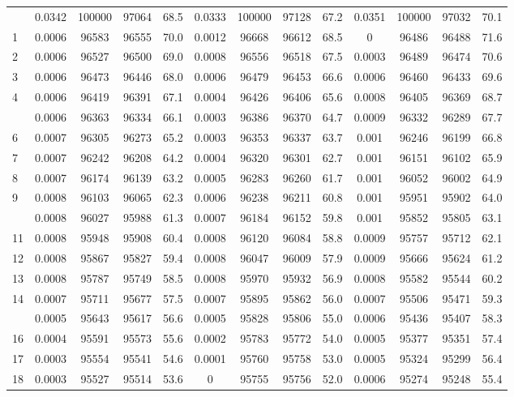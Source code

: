 \documentclass[
  14pt,
]{article}
\begin{document}
\begin{longtable}[t]{lcccccccccccc}
\endfoot
\bottomrule
\endlastfoot
0 & 0.0342 & 100000 & 97064 & 68.5 & 0.0333 & 100000 & 97128 & 67.2 & 0.0351 & 100000 & 97032 & 70.1\\
1 & 0.0006 & 96583 & 96555 & 70.0 & 0.0012 & 96668 & 96612 & 68.5 & 0 & 96486 & 96488 & 71.6\\
2 & 0.0006 & 96527 & 96500 & 69.0 & 0.0008 & 96556 & 96518 & 67.5 & 0.0003 & 96489 & 96474 & 70.6\\
3 & 0.0006 & 96473 & 96446 & 68.0 & 0.0006 & 96479 & 96453 & 66.6 & 0.0006 & 96460 & 96433 & 69.6\\
4 & 0.0006 & 96419 & 96391 & 67.1 & 0.0004 & 96426 & 96406 & 65.6 & 0.0008 & 96405 & 96369 & 68.7\\
\addlinespace
5 & 0.0006 & 96363 & 96334 & 66.1 & 0.0003 & 96386 & 96370 & 64.7 & 0.0009 & 96332 & 96289 & 67.7\\
6 & 0.0007 & 96305 & 96273 & 65.2 & 0.0003 & 96353 & 96337 & 63.7 & 0.001 & 96246 & 96199 & 66.8\\
7 & 0.0007 & 96242 & 96208 & 64.2 & 0.0004 & 96320 & 96301 & 62.7 & 0.001 & 96151 & 96102 & 65.9\\
8 & 0.0007 & 96174 & 96139 & 63.2 & 0.0005 & 96283 & 96260 & 61.7 & 0.001 & 96052 & 96002 & 64.9\\
9 & 0.0008 & 96103 & 96065 & 62.3 & 0.0006 & 96238 & 96211 & 60.8 & 0.001 & 95951 & 95902 & 64.0\\
\addlinespace
10 & 0.0008 & 96027 & 95988 & 61.3 & 0.0007 & 96184 & 96152 & 59.8 & 0.001 & 95852 & 95805 & 63.1\\
11 & 0.0008 & 95948 & 95908 & 60.4 & 0.0008 & 96120 & 96084 & 58.8 & 0.0009 & 95757 & 95712 & 62.1\\
12 & 0.0008 & 95867 & 95827 & 59.4 & 0.0008 & 96047 & 96009 & 57.9 & 0.0009 & 95666 & 95624 & 61.2\\
13 & 0.0008 & 95787 & 95749 & 58.5 & 0.0008 & 95970 & 95932 & 56.9 & 0.0008 & 95582 & 95544 & 60.2\\
14 & 0.0007 & 95711 & 95677 & 57.5 & 0.0007 & 95895 & 95862 & 56.0 & 0.0007 & 95506 & 95471 & 59.3\\
\addlinespace
15 & 0.0005 & 95643 & 95617 & 56.6 & 0.0005 & 95828 & 95806 & 55.0 & 0.0006 & 95436 & 95407 & 58.3\\
16 & 0.0004 & 95591 & 95573 & 55.6 & 0.0002 & 95783 & 95772 & 54.0 & 0.0005 & 95377 & 95351 & 57.4\\
17 & 0.0003 & 95554 & 95541 & 54.6 & 0.0001 & 95760 & 95758 & 53.0 & 0.0005 & 95324 & 95299 & 56.4\\
18 & 0.0003 & 95527 & 95514 & 53.6 & 0 & 95755 & 95756 & 52.0 & 0.0006 & 95274 & 95248 & 55.4\\

\end{longtable}
\end{document}
